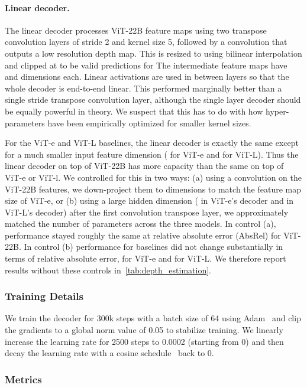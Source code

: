 \documentclass{article}
\begin{document}
\paragraph{Linear decoder.}

The linear decoder processes  ViT-22B feature maps using two transpose convolution layers of stride 2 and kernel size 5, followed by a  convolution that outputs a low resolution depth map.
This is resized to  using bilinear interpolation and clipped at  to be valid predictions for 
The intermediate feature maps have  and  dimensions each.
Linear activations are used in between layers so that the whole decoder is end-to-end linear.
This performed marginally better than a single  stride  transpose convolution layer, although the single layer decoder should be equally powerful in theory.
We suspect that this has to do with how hyper-parameters have been empirically optimized for smaller kernel sizes.

For the ViT-e and ViT-L baselines, the linear decoder is exactly the same except for a much smaller input feature dimension ( for ViT-e and  for ViT-L).
Thus the linear decoder on top of ViT-22B has more capacity than the same on top of ViT-e or ViT-l.
We controlled for this in two ways: (a) using a  convolution on the ViT-22B features, we down-project them to  dimensions to match the feature map size of ViT-e, or (b) using a large hidden dimension ( in ViT-e's decoder and  in ViT-L's decoder) after the first convolution transpose layer, we approximately matched the number of parameters across the three models. In control (a), performance stayed roughly the same at  relative absolute error (AbsRel) for ViT-22B. In control (b) performance for baselines did not change substantially in terms of relative absolute error,  for ViT-e and  for ViT-L. We therefore report results without these controls in~\cref{tab:depth_estimation}.

\subsubsection{Training Details}

We train the decoder for 300k steps with a batch size of 64 using Adam~\citep{kingma2014adam} and clip the gradients to a global norm value of 0.05 to stabilize training.
We linearly increase the learning rate for 2500 steps to 0.0002 (starting from 0) and then decay the learning rate with a cosine schedule~\citep{loshchilov2016sgdr} back to 0.

\subsubsection{Metrics}
\end{document}
